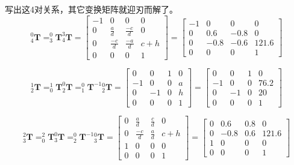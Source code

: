 \documentclass{homework}
\begin{document}
\begin{sol}
  写出这4对关系，其它变换矩阵就迎刃而解了。
  \[
    _4^0\mathbf{T} = _3^0\mathbf{T} _4^3\mathbf{T} =
    \begin{bmatrix}
      -1 & 0 & 0 & 0 \\
      0 & \frac{a}{d} & \frac{-c}{d} & 0 \\
      0 & \frac{-c}{d} & \frac{-a}{d} & c+h \\
      0 & 0 & 0 & 1
    \end{bmatrix} =
    \begin{bmatrix}
      -1 & 0 & 0 & 0 \\
      0 & 0.6 & -0.8 & 0 \\
      0 & -0.8 & -0.6 & 121.6 \\
      0 & 0 & 0 & 1
    \end{bmatrix}
  \]

  \[
    _2^1\mathbf{T} = _0^1\mathbf{T} _2^0\mathbf{T} = _1^0\mathbf{T}^{-1} {_2^0}\mathbf{T} =
    \begin{bmatrix}
      0 & 0 & 1 & 0 \\
      -1 & 0 & 0 & a \\
      0 & -1 & 0 & h \\
      0 & 0 & 0 & 1
    \end{bmatrix} =
    \begin{bmatrix}
      0 & 0 & 1 & 0 \\
      -1 & 0 & 0 & 76.2 \\
      0 & -1 & 0 & 20 \\
      0 & 0 & 0 & 1
    \end{bmatrix}
  \]

  \[
    _3^2\mathbf{T} = _0^2\mathbf{T} _3^0\mathbf{T} = _2^0\mathbf{T}^{-1} {_3^0}\mathbf{T} = 
    \begin{bmatrix}
      0 & \frac{a}{d} & \frac{c}{d} & 0 \\
      0 & \frac{-c}{d} & \frac{a}{d} & c+h \\
      1 & 0 & 0 & 0 \\
      0 & 0 & 0 & 1
    \end{bmatrix} =
    \begin{bmatrix}
      0 & 0.6 & 0.8 & 0 \\
      0 & -0.8 & 0.6 & 121.6 \\
      1 & 0 & 0 & 0 \\
      0 & 0 & 0 & 1
    \end{bmatrix}
  \]

\end{sol}
\end{document}
